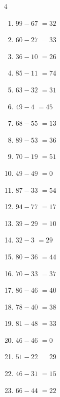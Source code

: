 \begin{multicols}{4}
\begin{enumerate}
  \item $99-67$
        $=32$

  \item $60-27$
        $=33$

\columnbreak %

  \item $36-10$
        $=26$

  \item $85-11$
        $=74$

  \item $63-32$
        $=31$

  \item $49-4$
        $=45$

  \item $68-55$
        $=13$

  \item $89-53$
        $=36$

  \item $70-19$
        $=51$

  \item $49-49$
        $=0$

  \item $87-33$
        $=54$

  \item $94-77$
        $=17$

  \item $39-29$
        $=10$

  \item $32-3$
        $=29$

  \item $80-36$
        $=44$

  \item $70-33$
        $=37$

  \item $86-46$
        $=40$

  \item $78-40$
        $=38$

  \item $81-48$
        $=33$

  \item $46-46$
        $=0$

  \item $51-22$
        $=29$

  \item $46-31$
        $=15$

  \item $66-44$
        $=22$


\end{enumerate}
\end{multicols}

